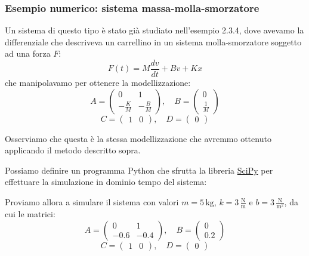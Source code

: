 \documentclass[a4paper,11pt]{article}
\begin{document}
\subsubsection{Esempio numerico: sistema massa-molla-smorzatore}
Un sistema di questo tipo è stato già studiato nell'esempio 2.3.4, dove avevamo la differenziale che descriveva un carrellino in un sistema molla-smorzatore soggetto ad una forza $F$:
$$
F(t) = M \frac{dv}{dt} + Bv + Kx
$$
che manipolavamo per ottenere la modellizzazione:
$$
A = \begin{pmatrix}
	0 & 1 \\ 
	-\frac{K}{M} & -\frac{B}{M}
\end{pmatrix}, \quad 
B = \begin{pmatrix}
	0 \\ \frac{1}{M}
\end{pmatrix}
$$
$$
C = \begin{pmatrix}
	1 & 0
\end{pmatrix}, \quad 
D = \begin{pmatrix}
0
\end{pmatrix}
$$

Osserviamo che questa è la stessa modellizzazione che avremmo ottenuto applicando il metodo descritto sopra.

Possiamo definire un programma Python che sfrutta la libreria \href{http://scipy.org}{SciPy} per effettuare la simulazione in dominio tempo del sistema:
\lstset{style=codestyle, language=python}


Proviamo allora a simulare il sistema con valori $m = 5 \, \mathrm{kg}$, $k = 3 \, \frac{\mathrm{N}}{\mathrm{m}}$ e $b = 3 \, \frac{\mathrm{N}}{\mathrm{m}^2}$, da cui le matrici:
$$
A = \begin{pmatrix}
	0 & 1 \\ 
	-0.6 & -0.4
\end{pmatrix}, \quad 
B = \begin{pmatrix}
	0 \\ 0.2
\end{pmatrix}
$$
$$
C = \begin{pmatrix}
	1 & 0
\end{pmatrix}, \quad 
D = \begin{pmatrix}
0
\end{pmatrix}
$$
\end{document}

